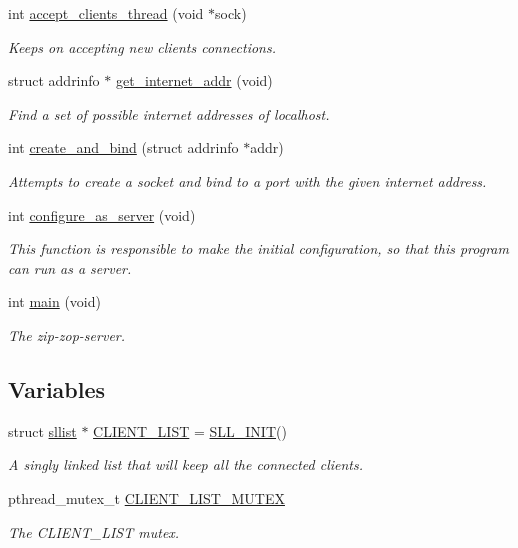 \begin{DoxyCompactItemize}
int \hyperlink{zip-zop-server_8c_a8c505192e7c73e767d53f7d282cfb646}{accept\+\_\+clients\+\_\+thread} (void $\ast$sock)
\begin{DoxyCompactList}\small\item\em Keeps on accepting new clients connections. \end{DoxyCompactList}\item 
struct addrinfo $\ast$ \hyperlink{zip-zop-server_8c_a2d9748875d07382b9dbecb97c6cd9b62}{get\+\_\+internet\+\_\+addr} (void)
\begin{DoxyCompactList}\small\item\em Find a set of possible internet addresses of localhost. \end{DoxyCompactList}\item 
int \hyperlink{zip-zop-server_8c_a0ecdeaf556729d827a07915b7a89866c}{create\+\_\+and\+\_\+bind} (struct addrinfo $\ast$addr)
\begin{DoxyCompactList}\small\item\em Attempts to create a socket and bind to a port with the given internet address. \end{DoxyCompactList}\item 
int \hyperlink{zip-zop-server_8c_a59ee6eb284b065353164c1aa7d487ce2}{configure\+\_\+as\+\_\+server} (void)
\begin{DoxyCompactList}\small\item\em This function is responsible to make the initial configuration, so that this program can run as a server. \end{DoxyCompactList}\item 
int \hyperlink{zip-zop-server_8c_a840291bc02cba5474a4cb46a9b9566fe}{main} (void)
\begin{DoxyCompactList}\small\item\em The zip-\/zop-\/server. \end{DoxyCompactList}\end{DoxyCompactItemize}
\subsection*{Variables}
\begin{DoxyCompactItemize}
\item 
struct \hyperlink{structsllist}{sllist} $\ast$ \hyperlink{zip-zop-server_8c_a32076dcdfaf1057a014d74d01cc7e08e}{C\+L\+I\+E\+N\+T\+\_\+\+L\+I\+ST} = \hyperlink{sllist_8h_a4f1348bb9eb6fe8c2b112e39c1887290}{S\+L\+L\+\_\+\+I\+N\+IT}()
\begin{DoxyCompactList}\small\item\em A singly linked list that will keep all the connected clients. \end{DoxyCompactList}\item 
pthread\+\_\+mutex\+\_\+t \hyperlink{zip-zop-server_8c_ac58873310e66c9bfafdbc798a8a7c7e2}{C\+L\+I\+E\+N\+T\+\_\+\+L\+I\+S\+T\+\_\+\+M\+U\+T\+EX}
\begin{DoxyCompactList}\small\item\em The {\ttfamily C\+L\+I\+E\+N\+T\+\_\+\+L\+I\+ST} mutex. \end{DoxyCompactList}\end{DoxyCompactItemize}


